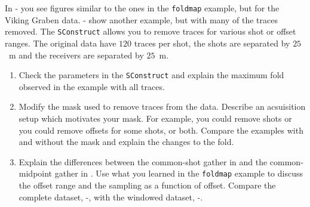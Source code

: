 In - you see figures similar to the ones in the \texttt{foldmap} example, but for the Viking Graben data. - show another example, but with many of the traces removed. The \texttt{SConstruct} allows you to remove traces for various shot or offset ranges. The original data have $120$ traces per shot, the shots are separated by $25$~m and the receivers are separated by $25$~m.
\begin{enumerate}
\item Check the parameters in the \texttt{SConstruct} and explain the maximum fold observed in the example with all traces.
\item Modify the mask used to remove traces from the data. Describe an acsuisition setup which motivates your mask. For example, you could remove shots or you could remove offsets for some shots, or both. Compare the examples with and without the mask and explain the changes to the fold.
\item Explain the differences between the common-shot gather in  and the common-midpoint gather in . Use what you learned in the \texttt{foldmap} example to discuss the offset range and the sampling as a function of offset. Compare the complete dataset, -, with the windowed dataset, -.
\end{enumerate}

\pagebreak
